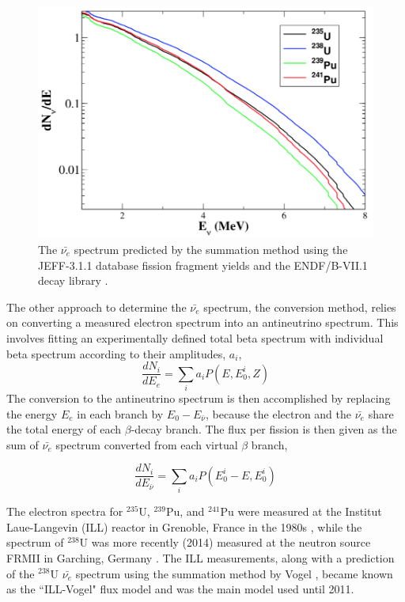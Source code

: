 \begin{figure}[t]
	\centering
	\includegraphics[width=0.65\linewidth]{tex/3-reactorneutrinos-images/Spectrum}
	\caption[The $\bar{\nu_e}$ spectrum.]{The $\bar{\nu_e}$ spectrum predicted by the summation method using the JEFF-3.1.1 database fission fragment yields and the ENDF/B-VII.1 decay library \cite{HayesVogel}.}
	\label{fig:spectrum}
\end{figure}

The other approach to determine the $\bar{\nu_{e}}$ spectrum, the conversion method, relies on converting a measured electron spectrum into an antineutrino spectrum. 
This involves fitting an experimentally defined total beta spectrum with individual beta spectrum  according to their amplitudes, $a_i$, 
\begin{equation}
	\frac{dN_i}{dE_e} = \sum_{i}a_iP(E,E^i_0,Z)
\end{equation}
The conversion to the antineutrino spectrum is then accomplished by replacing the energy $E_e$ in each branch by $E_0 - E_{\bar{\nu}}$, because the electron and the $\bar{\nu_e}$ share the total energy of each $\beta$-decay branch.
The flux per fission is then given as the sum of $\bar{\nu_e}$ spectrum converted from each virtual $\beta$ branch,

\begin{equation}
	\frac{dN_i}{dE_{\bar{\nu}}} = \sum_{i}a_iP(E^i_0-E,E^i_0)
\end{equation}


The electron spectra for $^{235}$U, $^{239}$Pu, and $^{241}$Pu were measured at the Institut
Laue-Langevin (ILL) reactor in Grenoble, France in the 1980s \cite{VonFeilitzsch:1982jw,Schreckenbach:1985ep,Hahn:1989zr}, while the spectrum of $^{238}$U was more recently (2014) measured at the neutron source FRMII in Garching, Germany \cite{Haag:2013raa}.
The ILL measurements, along with a prediction of the $^{238}$U $\bar{\nu_{e}}$ spectrum using the summation method by Vogel \cite{PhysRevC.24.1543}, became known as the ``ILL-Vogel" flux model and was the main model used until 2011.

